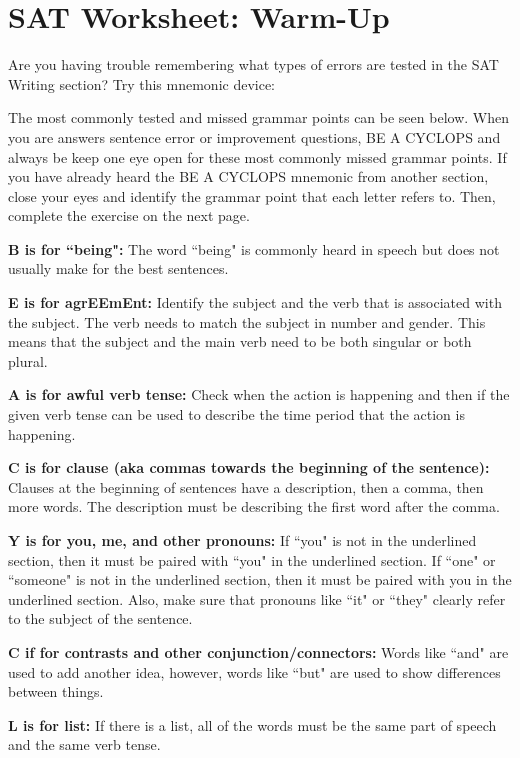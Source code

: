 \section{SAT Worksheet: Warm-Up}

Are you having trouble remembering what types of errors are tested in the SAT Writing section?
Try this mnemonic device:

The most commonly tested and missed grammar points can be seen below. When you are answers sentence error or improvement questions, BE A CYCLOPS and always be keep one eye open for these most commonly missed grammar points. If you have already heard the BE A CYCLOPS mnemonic from another section, close your eyes and identify the grammar point that each letter refers to. Then, complete the exercise on the next page. 

\bigskip
\textbf{B is for ``being":} The word ``being" is commonly heard in speech but does not usually make for the best sentences.

\bigskip
\textbf{E is for agrEEmEnt:} Identify the subject and the verb that is associated with the subject. The verb needs to match the subject in number and gender. This means that the subject and the main verb need to be both singular or both plural. 

\bigskip

\bigskip
\textbf{A is for awful verb tense:} Check when the action is happening and then if the given verb tense can be used to describe the time period that the action is happening. 

\bigskip

\bigskip
\textbf{C is for clause (aka commas towards the beginning of the sentence):} Clauses at the beginning of sentences have a description, then a comma, then more words. The description must be describing the first word after the comma. 

\bigskip
\textbf{Y is for you, me, and other pronouns:} If ``you" is not in the underlined section, then it must be paired with ``you" in the underlined section. If ``one" or ``someone" is not in the underlined section, then it must be paired with you in the underlined section. Also, make sure that pronouns like ``it" or ``they" clearly refer to the subject of the sentence. 

\bigskip
\textbf{C if for contrasts and other conjunction/connectors:} Words like ``and" are used to add another idea, however, words like ``but" are used to show differences between things. 

\bigskip
\textbf{L is for list:} If there is a list, all of the words must be the same part of speech and the same verb tense. 

